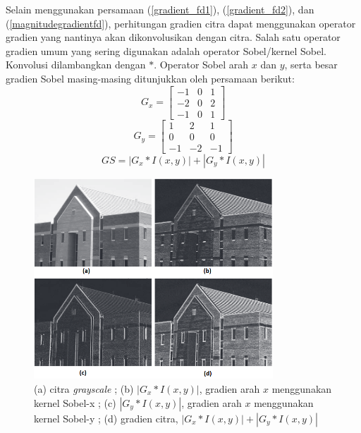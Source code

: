 Selain menggunakan persamaan (\ref{gradient_fd1}), (\ref{gradient_fd2}), dan (\ref{magnitudegradientfd}), perhitungan gradien citra dapat menggunakan operator gradien yang nantinya akan dikonvolusikan dengan citra. Salah satu operator gradien umum yang sering digunakan adalah operator Sobel/kernel Sobel. Konvolusi dilambangkan dengan $\ast$. Operator Sobel arah $x$ dan $y$, serta besar gradien Sobel masing-masing ditunjukkan oleh persamaan berikut:
\begin{equation}
	\label{sobel_x}
	G_x = 
	\begin{bmatrix}
		-1 & 0 & 1	\\
		-2 & 0 & 2	\\
		-1 & 0 & 1	
	\end{bmatrix}
\end{equation}
\begin{equation}
	\label{sobel_y}
	G_y = 
	\begin{bmatrix}
		1 & 2 & 1	\\
		0 & 0 & 0	\\
		-1 & -2 & -1	
	\end{bmatrix}
\end{equation}
\begin{equation}
	\label{sobel_mag}
	GS = | G_x \ast I(x,y) | + | G_y \ast I(x,y) |
\end{equation}

\begin{figure}[H]
	\centering
	\includegraphics[width=0.8\textwidth]{gambar/sobel}
	\caption{(a) citra \emph{grayscale} ; (b) $|G_x \ast I(x,y)|$, gradien arah $x$ menggunakan kernel Sobel-x ; (c) $|G_y \ast I(x,y)|$, gradien arah $x$ menggunakan kernel Sobel-y ; (d) gradien citra, $| G_x \ast I(x,y) | + | G_y \ast I(x,y) |$ \citep{gonzalez2002digital}}
	\label{Gambar:sobel}
\end{figure}

